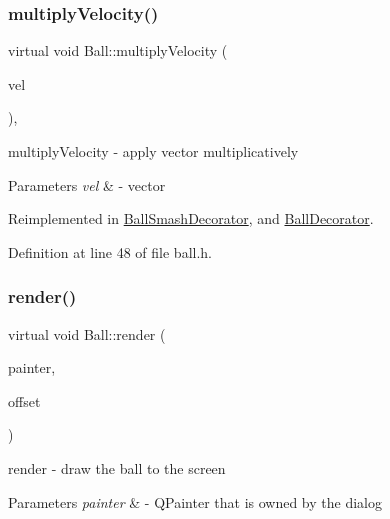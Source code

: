 \subsubsection{\texorpdfstring{multiply\+Velocity()}{multiplyVelocity()}}
{\footnotesize\ttfamily virtual void Ball\+::multiply\+Velocity (\begin{DoxyParamCaption}\item[{const Q\+Vector2D \&}]{vel }\end{DoxyParamCaption})\hspace{0.3cm}{\ttfamily [inline]}, {\ttfamily [virtual]}}



multiply\+Velocity -\/ apply vector multiplicatively 


\begin{DoxyParams}{Parameters}
{\em vel} & -\/ vector \\
\hline
\end{DoxyParams}


Reimplemented in \mbox{\hyperlink{class_ball_smash_decorator_a017998926f2b3ebdfcf49e074ea86aae}{Ball\+Smash\+Decorator}}, and \mbox{\hyperlink{class_ball_decorator_ad1a9139a5c41d17d0eebf007afb984e7}{Ball\+Decorator}}.



Definition at line 48 of file ball.\+h.

\mbox{\label{class_ball_a307773aaa59aee90cef8767b0c22deca}} 
\subsubsection{\texorpdfstring{render()}{render()}}
{\footnotesize\ttfamily virtual void Ball\+::render (\begin{DoxyParamCaption}\item[{Q\+Painter \&}]{painter,  }\item[{const Q\+Vector2D \&}]{offset }\end{DoxyParamCaption})\hspace{0.3cm}{\ttfamily [pure virtual]}}



render -\/ draw the ball to the screen 


\begin{DoxyParams}{Parameters}
{\em painter} & -\/ Q\+Painter that is owned by the dialog \\
\hline
\end{DoxyParams}


